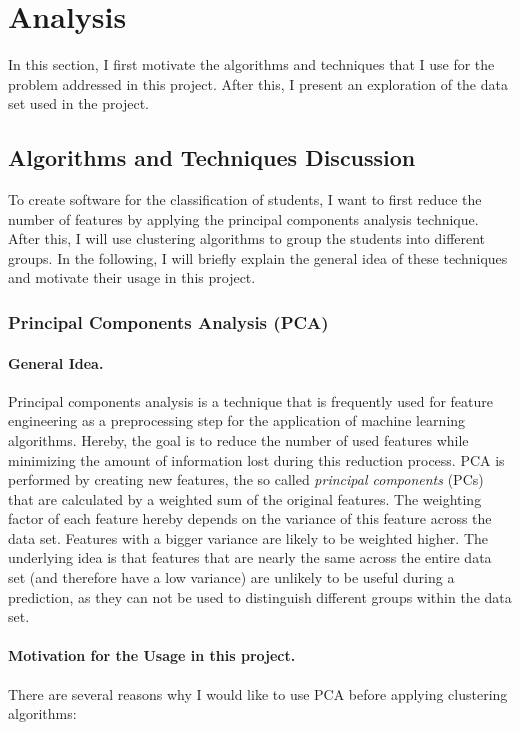 \section{Analysis}

In this section, I first motivate the algorithms and techniques that I use for the problem addressed in this project. After this, I present an exploration of the data set used in the project. 

\subsection{Algorithms and Techniques Discussion}
To create software for the classification of students, I want to first reduce the number of features by applying the principal components analysis technique. After this, I will use clustering algorithms to group the students into different groups. In the following, I will briefly explain the general idea of these techniques and motivate their usage in this project. 

\subsubsection{Principal Components Analysis (PCA)}

\paragraph{General Idea.} Principal components analysis is a technique that is frequently used for feature engineering as a preprocessing step for the application of machine learning algorithms. Hereby, the goal is to reduce the number of used features while minimizing the amount of information lost during this reduction process. PCA is performed by creating new features, the so called \emph{principal components} (PCs) that are calculated by a weighted sum of the original features. The weighting factor of each feature hereby depends on the variance of this feature across the data set. Features with a bigger variance are likely to be weighted higher. The underlying idea is that features that are nearly the same across the entire data set (and therefore have a low variance) are unlikely to be useful during a prediction, as they can not be used to distinguish different groups within the data set.

\paragraph{Motivation for the Usage in this project.} There are several reasons why I would like to use PCA before applying clustering algorithms:

